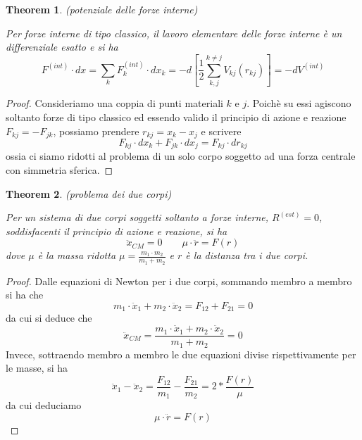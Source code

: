 \documentclass{article}
\newtheorem{theorem}{Theorem}[section]
\begin{document}
            \begin{theorem}(potenziale delle forze interne)
                \label{thm:potenziale delle forze interne}

                Per forze interne di tipo classico, il lavoro elementare delle forze interne è un differenziale esatto e si ha 
                \[ F^{(int)} \cdot dx = \sum_k F_k^{(int)} \cdot dx_k = -d[\frac{1}{2} \sum_{k, j}^{k \neq j} V_{kj}(r_{kj})] = -dV^{(int)} \]

            \end{theorem}
            \begin{proof}

                Consideriamo una coppia di punti materiali $k$ e $j$. Poichè su essi agiscono soltanto forze di tipo classico ed essendo valido il principio di azione e reazione 
                $F_{kj} = - F_{jk}$, possiamo prendere $r_{kj} = x_k - x_j$ e scrivere \[ F_{kj} \cdot dx_k + F_{jk} \cdot dx_j = F_{kj} \cdot dr_{kj} \]
                ossia ci siamo ridotti al problema di un solo corpo soggetto ad una forza centrale con simmetria sferica.

            \end{proof}

            \begin{theorem}(problema dei due corpi)
                \label{thm:problema dei due corpi}

                Per un sistema di due corpi soggetti soltanto a forze interne, $R^{(est)} = 0$, soddisfacenti il principio di azione e reazione, si ha 
                \[ \ddot{x}_{CM} = 0 \quad \quad \mu \cdot \ddot{r} = F(r) \] dove $\mu$ è la massa ridotta $\mu = \frac{m_1 \cdot m_2}{m_1 + m_2}$ e $r$ è la distanza tra i due corpi.

            \end{theorem}
            \begin{proof}
                
                Dalle equazioni di Newton per i due corpi, sommando membro a membro si ha che \[ m_1 \cdot \ddot{x}_1 + m_2 \cdot \ddot{x}_2 = F_{12} + F_{21} = 0 \] da cui si deduce che 
                \[ \ddot{x}_{CM} = \frac{m_1 \cdot \ddot{x}_1 + m_2 \cdot \ddot{x}_2}{m_1 + m_2} = 0 \]
                Invece, sottraendo membro a membro le due equazioni divise rispettivamente per le masse, si ha \[ \ddot{x}_1 - \ddot{x}_2 = \frac{F_{12}}{m_1} - \frac{F_{21}}{m_2} = 2 * \frac{F(r)}{\mu} \]
                da cui deduciamo \[ \mu \cdot \ddot{r} = F(r) \]

            \end{proof}
\end{document}
